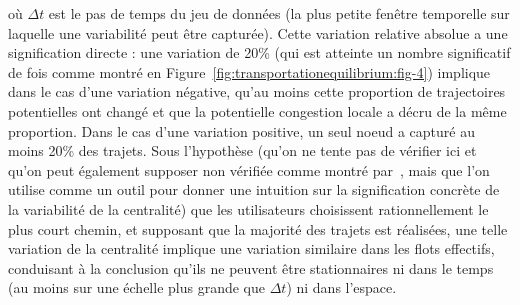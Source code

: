 {où $\Delta t$ est le pas de temps du jeu de données (la plus petite fenêtre temporelle sur laquelle une variabilité peut être capturée). Cette variation relative absolue a une signification directe : une variation de 20\% (qui est atteinte un nombre significatif de fois comme montré en Figure~\ref{fig:transportationequilibrium:fig-4}) implique dans le cas d'une variation négative, qu'au moins cette proportion de trajectoires potentielles ont changé et que la potentielle congestion locale a décru de la même proportion. Dans le cas d'une variation positive, un seul noeud a capturé au moins 20\% des trajets. Sous l'hypothèse (qu'on ne tente pas de vérifier ici et qu'on peut également supposer non vérifiée comme montré par~\cite{zhu2010people}, mais que l'on utilise comme un outil pour donner une intuition sur la signification concrète de la variabilité de la centralité) que les utilisateurs choisissent rationnellement le plus court chemin, et supposant que la majorité des trajets est réalisées, une telle variation de la centralité implique une variation similaire dans les flots effectifs, conduisant à la conclusion qu'ils ne peuvent être stationnaires ni dans le temps (au moins sur une échelle plus grande que $\Delta t$) ni dans l'espace.
}





